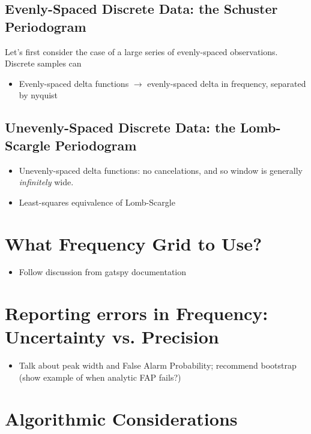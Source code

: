 \documentclass[preprint]{aastex}
\begin{document}
\subsection{Evenly-Spaced Discrete Data: the Schuster Periodogram}

Let's first consider the case of a large series of evenly-spaced observations.
Discrete samples can 


\begin{itemize}
\item Evenly-spaced delta functions $\to$ evenly-spaced delta in frequency, separated by nyquist
\end{itemize}

\subsection{Unevenly-Spaced Discrete Data: the Lomb-Scargle Periodogram}


\begin{itemize}
\item Unevenly-spaced delta functions: no cancelations, and so window is generally {\it infinitely} wide.
\item Least-squares equivalence of Lomb-Scargle
\end{itemize}

\section{What Frequency Grid to Use?}

\begin{itemize}
\item Follow discussion from gatspy documentation
\end{itemize}

\section{Reporting errors in Frequency: Uncertainty vs. Precision}

\begin{itemize}
\item Talk about peak width and False Alarm Probability; recommend bootstrap (show example of when analytic FAP fails?)
\end{itemize}

\section{Algorithmic Considerations}
\end{document}
